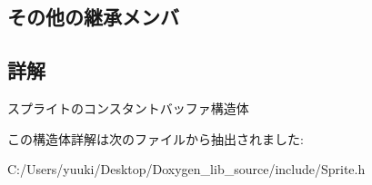 \subsection*{その他の継承メンバ}


\subsection{詳解}
スプライトのコンスタントバッファ構造体 

この構造体詳解は次のファイルから抽出されました\+:\begin{DoxyCompactItemize}
\item 
C\+:/\+Users/yuuki/\+Desktop/\+Doxygen\+\_\+lib\+\_\+source/include/Sprite.\+h\end{DoxyCompactItemize}
